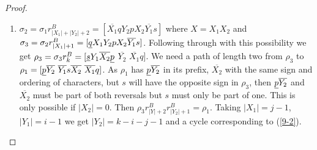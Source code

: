 \documentclass[final]{dmtcs-episciences}
\numberwithin{equation}{section}
\begin{document}
\begin{proof}
\begin{enumerate}
\begin{enumerate}
    \begin{enumerate}
        \item $\sigma_{2}=\sigma_{1}r^B_{|X_1|+|Y_2|+2}=[\overline{X_1} q Y_2 p X_2 \overline{Y_1}s]$ where $X=X_1X_2$ and $\sigma_{3}=\sigma_{2}r^B_{|X_1|+1}= [\uline{q} X_1 Y_2 p X_2 \overline{Y_1} s]$. Following through with this possibility we get $\rho_{3}=\sigma_{3}r^B_k=[\uline{s} Y_1 \overline{X_2} \uline{p}$ $\overline{Y_2}$ $\overline{X_1} q]$. We need a path of length two from $\rho_{3}$ to $\rho_{1}=[\uline{p}\overline{Y_2}\ \overline{Y_1} s \overline{X_2}\ \overline{X_1}q]$. As $\rho_{1}$ has $\uline{p}\overline{Y_2}$ in its prefix, $\overline{X_2}$ with the same sign and ordering of characters, but $s$ will have the opposite sign in $\rho_{3}$, then $\uline{p}\overline{Y_2}$ and $\overline{X_2}$ must be part of both reversals but $s$ must only be part of one. %
        This is only possible if $|X_2|=0$. Then $\rho_{3}r^B_{|Y|+2}r^B_{|Y_2|+1}=\rho_{1}$. Taking $|X_1|=j-1$, $|Y_1|=i-1$ we get $|Y_2|=k-i-j-1$ and a cycle corresponding to (\ref{9-2}).
        

\end{enumerate}
\end{enumerate}
\end{enumerate}
\end{proof}
\end{document}
